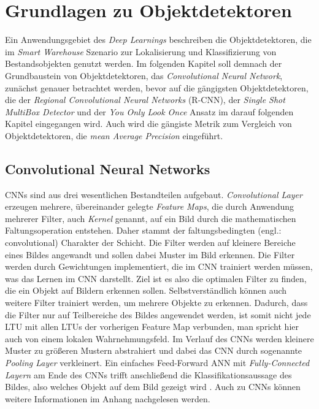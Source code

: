 \section{Grundlagen zu Objektdetektoren} \label{basics}

Ein Anwendungsgebiet des \textit{Deep Learnings} beschreiben die Objektdetektoren, die im \textit{Smart Warehouse} Szenario zur Lokalisierung und Klassifizierung von Bestandsobjekten genutzt werden. Im folgenden Kapitel soll demnach der Grundbaustein von Objektdetektoren, das \textit{Convolutional Neural Network}, zunächst genauer betrachtet werden, bevor auf die gängigsten Objektdetektoren, die der \textit{Regional Convolutional Neural Networks} (R-CNN), der \textit{Single Shot MultiBox Detector} und der \textit{You Only Look Once} Ansatz im darauf folgenden Kapitel eingegangen wird. Auch wird die gängiste Metrik zum Vergleich von Objektdetektoren, die \textit{mean Average Precision} eingeführt.

\subsection*{Convolutional Neural Networks}

CNNs sind aus drei wesentlichen Bestandteilen aufgebaut. \textit{Convolutional Layer} erzeugen mehrere, übereinander gelegte \textit{Feature Maps}, die durch Anwendung mehrerer Filter, auch \textit{Kernel} genannt, auf ein Bild durch die mathematischen Faltungsoperation entstehen. Daher stammt der \glqq faltungsbedingten\grqq{} (engl.: convolutional) Charakter der Schicht. Die Filter werden auf kleinere Bereiche eines Bildes angewandt und sollen dabei Muster im Bild erkennen. Die Filter werden durch Gewichtungen implementiert, die im CNN trainiert werden müssen, was das \glqq Lernen\grqq{} im CNN darstellt. Ziel ist es also die optimalen Filter zu finden, die ein Objekt auf Bildern erkennen sollen. Selbstverständlich können auch weitere Filter trainiert werden, um mehrere Objekte zu erkennen. Dadurch, dass die Filter nur auf Teilbereiche des Bildes angewendet werden, ist somit nicht jede LTU mit allen LTUs der vorherigen Feature Map verbunden, man spricht hier auch von einem \glqq lokalen Wahrnehmungsfeld\grqq{}. Im Verlauf des CNNs werden kleinere Muster zu größeren Mustern abstrahiert und dabei das CNN durch sogenannte \textit{Pooling Layer} verkleinert. Ein einfaches Feed-Forward ANN mit \textit{Fully-Connected Layern} am Ende des CNNs trifft anschließend die Klassifikationsaussage des Bildes, also welches Objekt auf dem Bild gezeigt wird \cite{AurelienGeron.2018}. Auch zu CNNs können weitere Informationen im Anhang nachgelesen werden.